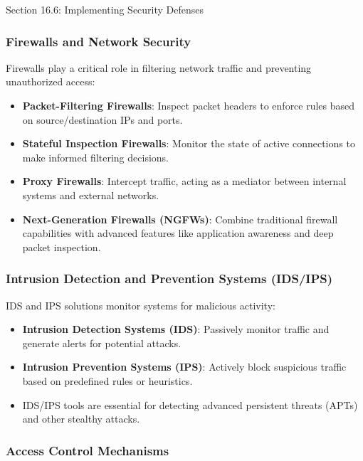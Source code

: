 \begin{notes}{Section 16.6: Implementing Security Defenses}
    \subsubsection*{Firewalls and Network Security}
    
    Firewalls play a critical role in filtering network traffic and preventing unauthorized access:
    \begin{itemize}
        \item \textbf{Packet-Filtering Firewalls}: Inspect packet headers to enforce rules based on source/destination IPs and ports.
        \item \textbf{Stateful Inspection Firewalls}: Monitor the state of active connections to make informed filtering decisions.
        \item \textbf{Proxy Firewalls}: Intercept traffic, acting as a mediator between internal systems and external networks.
        \item \textbf{Next-Generation Firewalls (NGFWs)}: Combine traditional firewall capabilities with advanced features like application awareness and deep packet inspection.
    \end{itemize}
    
    \subsubsection*{Intrusion Detection and Prevention Systems (IDS/IPS)}
    
    IDS and IPS solutions monitor systems for malicious activity:
    \begin{itemize}
        \item \textbf{Intrusion Detection Systems (IDS)}: Passively monitor traffic and generate alerts for potential attacks.
        \item \textbf{Intrusion Prevention Systems (IPS)}: Actively block suspicious traffic based on predefined rules or heuristics.
        \item IDS/IPS tools are essential for detecting advanced persistent threats (APTs) and other stealthy attacks.
    \end{itemize}
    
    \subsubsection*{Access Control Mechanisms}
    

\end{notes}
